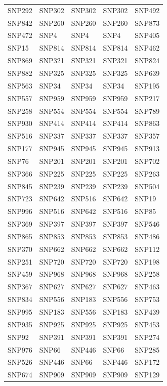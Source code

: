 \begin{table}[ht]
\begin{tabular}{lllll}
  SNP292 & SNP302 & SNP302 & SNP302 & SNP492 \\ 
  SNP842 & SNP260 & SNP260 & SNP260 & SNP873 \\ 
  SNP472 & SNP4 & SNP4 & SNP4 & SNP405 \\ 
  SNP15 & SNP814 & SNP814 & SNP814 & SNP462 \\ 
  SNP869 & SNP321 & SNP321 & SNP321 & SNP824 \\ 
  SNP882 & SNP325 & SNP325 & SNP325 & SNP639 \\ 
  SNP563 & SNP34 & SNP34 & SNP34 & SNP195 \\ 
  SNP557 & SNP959 & SNP959 & SNP959 & SNP217 \\ 
  SNP258 & SNP554 & SNP554 & SNP554 & SNP789 \\ 
  SNP930 & SNP414 & SNP414 & SNP414 & SNP863 \\ 
  SNP516 & SNP337 & SNP337 & SNP337 & SNP357 \\ 
  SNP177 & SNP945 & SNP945 & SNP945 & SNP913 \\ 
  SNP76 & SNP201 & SNP201 & SNP201 & SNP702 \\ 
  SNP366 & SNP225 & SNP225 & SNP225 & SNP263 \\ 
  SNP845 & SNP239 & SNP239 & SNP239 & SNP504 \\ 
  SNP723 & SNP642 & SNP516 & SNP642 & SNP19 \\ 
  SNP996 & SNP516 & SNP642 & SNP516 & SNP85 \\ 
  SNP369 & SNP397 & SNP397 & SNP397 & SNP546 \\ 
  SNP865 & SNP853 & SNP853 & SNP853 & SNP486 \\ 
  SNP370 & SNP662 & SNP662 & SNP662 & SNP112 \\ 
  SNP251 & SNP720 & SNP720 & SNP720 & SNP198 \\ 
  SNP459 & SNP968 & SNP968 & SNP968 & SNP258 \\ 
  SNP367 & SNP627 & SNP627 & SNP627 & SNP463 \\ 
  SNP834 & SNP556 & SNP183 & SNP556 & SNP753 \\ 
  SNP995 & SNP183 & SNP556 & SNP183 & SNP439 \\ 
  SNP935 & SNP925 & SNP925 & SNP925 & SNP453 \\ 
  SNP92 & SNP391 & SNP391 & SNP391 & SNP274 \\ 
  SNP976 & SNP66 & SNP446 & SNP66 & SNP285 \\ 
  SNP526 & SNP446 & SNP66 & SNP446 & SNP172 \\ 
  SNP674 & SNP909 & SNP909 & SNP909 & SNP129 \\ 

\end{tabular}
\end{table}
